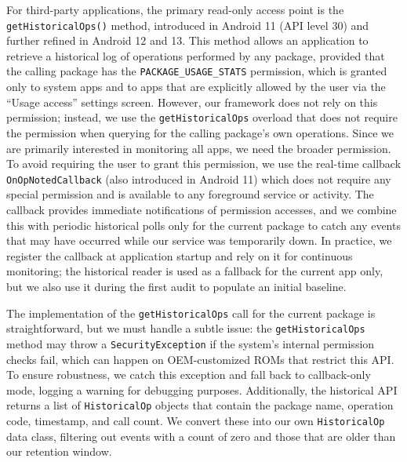 For third-party applications, the primary read-only access point is the \texttt{getHistoricalOps()} method, introduced in Android 11 (API level 30) and further refined in Android 12 and 13. This method allows an application to retrieve a historical log of operations performed by any package, provided that the calling package has the \texttt{PACKAGE\_USAGE\_STATS} permission, which is granted only to system apps and to apps that are explicitly allowed by the user via the ``Usage access'' settings screen. However, our framework does not rely on this permission; instead, we use the \texttt{getHistoricalOps} overload that does not require the permission when querying for the calling package's own operations. Since we are primarily interested in monitoring all apps, we need the broader permission. To avoid requiring the user to grant this permission, we use the real-time callback \texttt{OnOpNotedCallback} (also introduced in Android 11) which does not require any special permission and is available to any foreground service or activity. The callback provides immediate notifications of permission accesses, and we combine this with periodic historical polls only for the current package to catch any events that may have occurred while our service was temporarily down. In practice, we register the callback at application startup and rely on it for continuous monitoring; the historical reader is used as a fallback for the current app only, but we also use it during the first audit to populate an initial baseline.

The implementation of the \texttt{getHistoricalOps} call for the current package is straightforward, but we must handle a subtle issue: the \texttt{getHistoricalOps} method may throw a \texttt{SecurityException} if the system's internal permission checks fail, which can happen on OEM-customized ROMs that restrict this API. To ensure robustness, we catch this exception and fall back to callback-only mode, logging a warning for debugging purposes. Additionally, the historical API returns a list of \texttt{HistoricalOp} objects that contain the package name, operation code, timestamp, and call count. We convert these into our own \texttt{HistoricalOp} data class, filtering out events with a count of zero and those that are older than our retention window.

